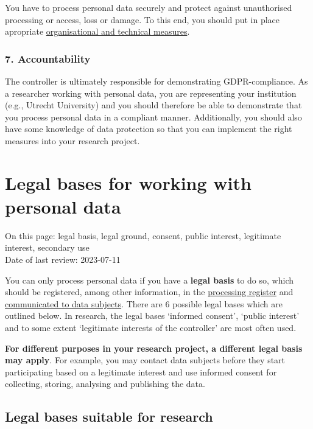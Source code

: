 \documentclass[
]{book}
\begin{document}
You have to process personal data securely and protect against unauthorised
processing or access, loss or damage. To this end, you should put in place
apropriate \protect\hyperlink{privacy-by-design}{organisational and technical measures}.

\hypertarget{accountability}{%
\subsubsection{7. Accountability}\label{accountability}}

The controller is ultimately responsible for demonstrating GDPR-compliance. As a
researcher working with personal data, you are representing your institution
(e.g., Utrecht University) and you should therefore be able to demonstrate that
you process personal data in a compliant manner. Additionally, you should also
have some knowledge of data protection so that you can implement the right
measures into your research project.

\hypertarget{legal-basis}{%
\section{Legal bases for working with personal data}\label{legal-basis}}

On this page: legal basis, legal ground, consent, public interest, legitimate
interest, secondary use\\
Date of last review: 2023-07-11

You can only process personal data if you have a \textbf{legal basis} to do so, which
should be registered, among other information, in the
\protect\hyperlink{processing-register}{processing register} and
\protect\hyperlink{privacy-notices}{communicated to data subjects}. There are 6 possible
legal bases which are outlined below. In research, the legal bases `informed
consent', `public interest' and to some extent `legitimate interests of the
controller' are most often used.

\textbf{For different purposes in your research project, a different
legal basis may apply}. For example, you may contact data subjects before they
start participating based on a legitimate interest and use informed consent for
collecting, storing, analysing and publishing the data.

\hypertarget{legal-bases-suitable-for-research}{%
\subsection{Legal bases suitable for research}\label{legal-bases-suitable-for-research}}
\end{document}
